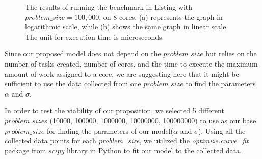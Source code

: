 \begin{figure}[H]
	\centering
	\caption{The results of running the benchmark in Listing with $problem\_size=100,000$, on 8 cores. (a) represents the graph in logarithmic scale, while (b) shows the same graph in linear scale. The unit for execution time is microseconds.}\label{fig60}		
\end{figure}

Since our proposed model does not depend on the $problem\_{size}$ but relies on the number of tasks created, number of cores, and the time to execute the maximum amount of work assigned to a core, we are suggesting here that it might be sufficient to use the data collected from one $problem\_{size}$ to find the parameters $\alpha$ and $\sigma$. 
 
In order to test the viability of our proposition, we selected 5 different $problem\_{size}$s (10000, 100000, 1000000, 10000000, 100000000) to use as our base $problem\_{size}$ for finding the parameters of our model($\alpha$ and $\sigma$). 
Using all the collected data points for each \emph{problem\_{size}}, we utilized the \emph{optimize.curve\_{fit}} package from $scipy$ library in Python to fit our model to the collected data.

